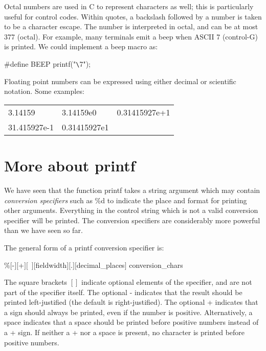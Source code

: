      Octal numbers  are used  in C  to represent 
characters as  well; this is particularly useful  for control codes.
Within quotes, a backslash followed by a number  is taken  to be  a
{\kc character  escape}. The  number is  interpreted in octal, and 
can be  at most  377 (octal). For example, many terminals emit a beep
when ASCII 7 (control-G) is printed. We could implement a beep macro
as:
\begin{code}
\#define  BEEP   printf("\verb+\+7");
\end{code}
\noindent
     Floating point  numbers  can  be  expressed  using either  decimal 
or scientific notation. Some examples:
\begin{display}\cd
\begin{tabular}{@{}lll@{}}
 3.14159   &     3.14159e0  &    0.31415927e+1 \\
 31.415927e-1 &  0.31415927e1   &
\end{tabular}
\end{display}


\section{More about {\cd printf}}

  We have  seen that  the function {\cd printf} takes a string
argument which may contain {\em conversion  specifiers} 
such as {\cd
\%d} to indicate the place and format for printing other  arguments.
Everything  in the  control string  which is  not a valid conversion 
specifier will  be printed.  The conversion  specifiers  are
considerably more powerful than we have seen so far.

     The general form of a {\cd printf} conversion specifier is:
\begin{code}
 \%$[$-$][$+$][$\ $][${\ms fieldwidth\/}$][$.$][${\ms decimal\_places}$]${\ms
conversion\_chars}
\end{code}
\noindent
     The square  brackets $[]$ indicate optional elements of the
specifier, and are not  part of  the specifier  itself. The  optional
{\cd -} indicates that  the result should  be printed left-justified
(the default is right-justified). The optional {\cd +}  indicates
that a sign should always be printed, even if the number is
positive.  Alternatively, a  space indicates that a space should be
printed before positive  numbers instead  of a  {\cd +} sign. If
neither a {\cd +} nor a space is present, no character is
printed before positive numbers.

